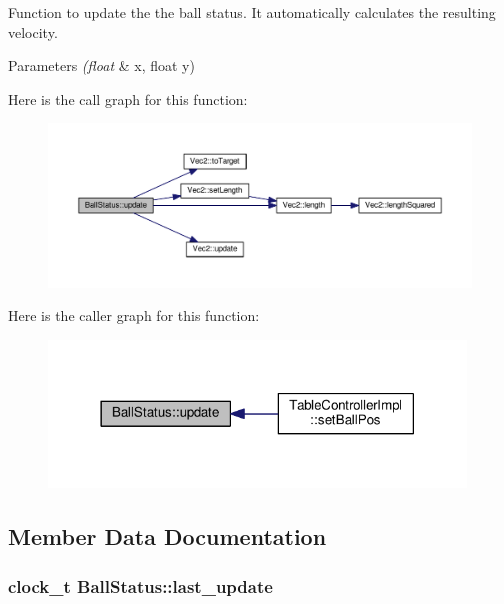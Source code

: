 Function to update the the ball status. It automatically calculates the resulting velocity.


\begin{DoxyParams}{Parameters}
{\em (float} & x, float y) \\
\hline
\end{DoxyParams}


Here is the call graph for this function\+:\nopagebreak
\begin{figure}[H]
\begin{center}
\leavevmode
\includegraphics[width=350pt]{class_ball_status_a248375c08a18fd1d6975dd8e8bbf6923_cgraph}
\end{center}
\end{figure}




Here is the caller graph for this function\+:\nopagebreak
\begin{figure}[H]
\begin{center}
\leavevmode
\includegraphics[width=314pt]{class_ball_status_a248375c08a18fd1d6975dd8e8bbf6923_icgraph}
\end{center}
\end{figure}




\subsection{Member Data Documentation}
\subsubsection[{\texorpdfstring{last\+\_\+update}{last_update}}]{\setlength{\rightskip}{0pt plus 5cm}clock\+\_\+t Ball\+Status\+::last\+\_\+update}\hypertarget{class_ball_status_a8a53c0c35e7179f0af564142f9cccf1c}{}\label{class_ball_status_a8a53c0c35e7179f0af564142f9cccf1c}
